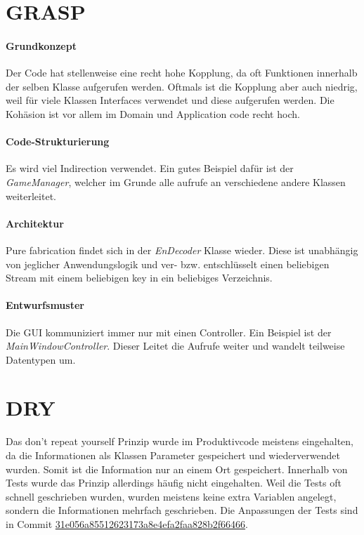 \section{GRASP}
\paragraph{Grundkonzept} Der Code hat stellenweise eine recht hohe Kopplung, da oft Funktionen innerhalb der selben Klasse aufgerufen werden. Oftmals ist die Kopplung aber auch niedrig, weil für viele Klassen Interfaces verwendet und diese aufgerufen werden. Die Kohäsion ist vor allem im Domain und Application code recht hoch.


\paragraph{Code-Strukturierung}
Es wird viel Indirection verwendet. Ein gutes Beispiel dafür ist der \textit{GameManager}, welcher im Grunde alle aufrufe an verschiedene andere Klassen weiterleitet.


\paragraph{Architektur}
\glqq Pure fabrication\grqq{} findet sich in der \textit{EnDecoder} Klasse wieder. Diese ist unabhängig von jeglicher Anwendungslogik und ver- bzw. entschlüsselt einen beliebigen Stream mit einem beliebigen key in ein beliebiges Verzeichnis.


\paragraph{Entwurfsmuster}
Die GUI kommuniziert immer nur mit einen Controller. Ein Beispiel ist der \textit{MainWindowController}. Dieser Leitet die Aufrufe weiter und wandelt teilweise Datentypen um.


\section{DRY}
Das \glqq don't repeat yourself\grqq{} Prinzip wurde im Produktivcode meistens eingehalten, da die Informationen als Klassen Parameter gespeichert und wiederverwendet wurden. Somit ist die Information nur an einem Ort gespeichert. Innerhalb von Tests wurde das Prinzip allerdings häufig nicht eingehalten. Weil die Tests oft schnell geschrieben wurden, wurden meistens keine extra Variablen angelegt, sondern die Informationen mehrfach geschrieben. Die Anpassungen der Tests sind in Commit \href{https://github.com/EinToni/Wortfinder/commit/31e056a85512623173a8e4efa2faa828b2f66466}{31e056a85512623173a8e4efa2faa828b2f66466}.
\endinput
